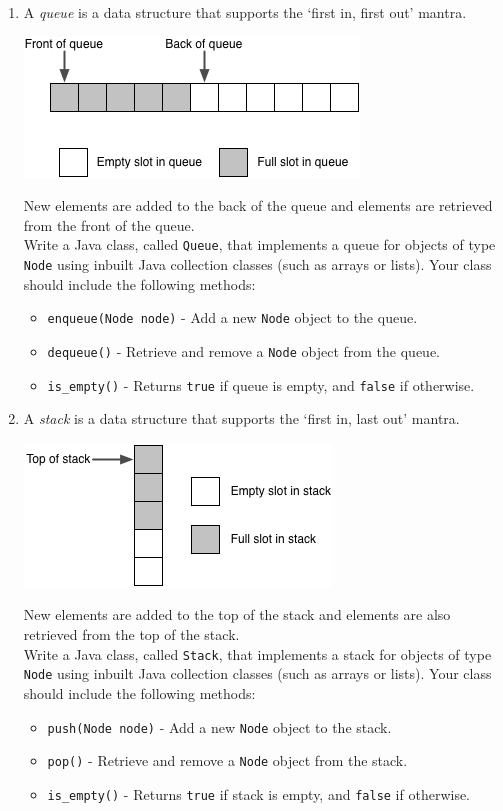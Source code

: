 \documentclass[11pt,a4paper]{report}
\begin{document}
\begin{enumerate}

\item A \textit{queue} is a data structure that supports the `first in, first out' mantra. \\
    \begin{center}
        \includegraphics[width=.4\textwidth]{media/queue.png} \\
    \end{center}
    New elements are added to the back of the queue and elements are retrieved from the front of the queue.\\
    \vskip5pt
    Write a Java class, called \texttt{Queue}, that implements a queue for objects of type \texttt{Node} using inbuilt Java collection classes (such as arrays or lists). Your class should include the following methods:
    \begin{itemize}
        \item \texttt{enqueue(Node node)} - Add a new \texttt{Node} object to the queue.
        \item \texttt{dequeue()} - Retrieve and remove a \texttt{Node} object from the queue.
        \item \texttt{is\_empty()} - Returns \texttt{true} if queue is empty, and \texttt{false} if otherwise.
    \end{itemize}
 
\item A \textit{stack} is a data structure that supports the `first in, last out' mantra. \\
    \begin{center}
        \includegraphics[width=.4\textwidth]{media/stack.png} \\
    \end{center}
    New elements are added to the top of the stack and elements are also retrieved from the top of the stack.\\
    \vskip5pt
    Write a Java class, called \texttt{Stack}, that implements a stack for objects of type \texttt{Node} using inbuilt Java collection classes (such as arrays or lists). Your class should include the following methods:
    \begin{itemize}
        \item \texttt{push(Node node)} - Add a new \texttt{Node} object to the stack.
        \item \texttt{pop()} - Retrieve and remove a \texttt{Node} object from the stack.
        \item \texttt{is\_empty()} - Returns \texttt{true} if stack is empty, and \texttt{false} if otherwise.
    \end{itemize}


\end{enumerate}
\end{document}
